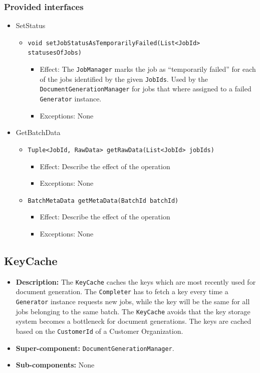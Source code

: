 \documentclass[a4paper,10pt]{article}
\begin{document}
\subsubsection*{Provided interfaces}
\begin{itemize}
    \item SetStatus
    \begin{itemize}
        \item \texttt{void setJobStatusAsTemporarilyFailed(List<JobId> statusesOfJobs)}
        \begin{itemize}
            \item Effect: The \texttt{JobManager} marks the job as ``temporarily failed'' for each of the jobs identified by the given \texttt{JobIds}. Used by the \texttt{DocumentGenerationManager} for jobs that where assigned to a failed \texttt{Generator} instance.
            \item Exceptions: None
        \end{itemize}
    \end{itemize}
    
	\item GetBatchData
    \begin{itemize}
        \item \texttt{Tuple<JobId, RawData> getRawData(List<JobId> jobIds)}
        \begin{itemize}
            \item Effect: Describe the effect of the operation
            \item Exceptions: None
        \end{itemize}
        \item \texttt{BatchMetaData getMetaData(BatchId batchId)}
        \begin{itemize}
            \item Effect: Describe the effect of the operation
            \item Exceptions: None
        \end{itemize}
    \end{itemize}    
    
\end{itemize}

\subsection{KeyCache}
\begin{itemize}
    \item \textbf{Description:} The \texttt{KeyCache} caches the keys which are most recently used for document generation. The \texttt{Completer} has to fetch a key every time a \texttt{Generator} instance requests new jobs, while the key will be the same for all jobs belonging to the same batch. The \texttt{KeyCache} avoids that the key storage system becomes a bottleneck for document generations. The keys are cached based on the \texttt{CustomerId} of a Customer Organization.
    \item \textbf{Super-component:}  \texttt{DocumentGenerationManager}.
    \item \textbf{Sub-components:} None
\end{itemize}
\end{document}

